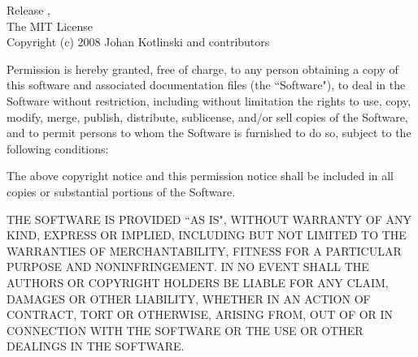 

\setlength{\parindent}{0pt}

Release \texttt{\revisiontagdoc}, \space \revisiondate\\[18pt]

The MIT License\\

Copyright (c) 2008 \space Johan Kotlinski and contributors

\begin{flushleft}
Permission is hereby granted, free of charge, to any person obtaining a copy
of this software and associated documentation files (the ``Software"), to deal
in the Software without restriction, including without limitation the rights
to use, copy, modify, merge, publish, distribute, sublicense, and/or sell
copies of the Software, and to permit persons to whom the Software is
furnished to do so, subject to the following conditions:
\end{flushleft}

\begin{flushleft}
The above copyright notice and this permission notice shall be included in
all copies or substantial portions of the Software.
\end{flushleft}

\begin{flushleft}
THE SOFTWARE IS PROVIDED ``AS IS", WITHOUT WARRANTY OF ANY KIND, EXPRESS OR
IMPLIED, INCLUDING BUT NOT LIMITED TO THE WARRANTIES OF MERCHANTABILITY,
FITNESS FOR A PARTICULAR PURPOSE AND NONINFRINGEMENT. IN NO EVENT SHALL THE
AUTHORS OR COPYRIGHT HOLDERS BE LIABLE FOR ANY CLAIM, DAMAGES OR OTHER
LIABILITY, WHETHER IN AN ACTION OF CONTRACT, TORT OR OTHERWISE, ARISING FROM,
OUT OF OR IN CONNECTION WITH THE SOFTWARE OR THE USE OR OTHER DEALINGS IN
THE SOFTWARE.
\end{flushleft}

